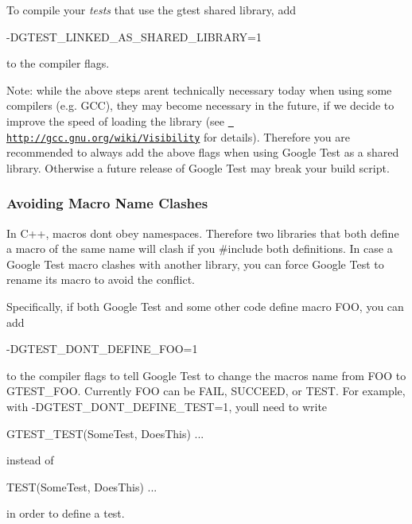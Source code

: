 To compile your {\itshape tests} that use the gtest shared library, add \begin{DoxyVerb}-DGTEST_LINKED_AS_SHARED_LIBRARY=1
\end{DoxyVerb}


to the compiler flags.

Note\+: while the above steps aren\textquotesingle{}t technically necessary today when using some compilers (e.\+g. G\+CC), they may become necessary in the future, if we decide to improve the speed of loading the library (see \href{http://gcc.gnu.org/wiki/Visibility}\texttt{ http\+://gcc.\+gnu.\+org/wiki/\+Visibility} for details). Therefore you are recommended to always add the above flags when using Google Test as a shared library. Otherwise a future release of Google Test may break your build script.

\subsubsection*{Avoiding Macro Name Clashes}

In C++, macros don\textquotesingle{}t obey namespaces. Therefore two libraries that both define a macro of the same name will clash if you {\ttfamily \#include} both definitions. In case a Google Test macro clashes with another library, you can force Google Test to rename its macro to avoid the conflict.

Specifically, if both Google Test and some other code define macro F\+OO, you can add \begin{DoxyVerb}-DGTEST_DONT_DEFINE_FOO=1
\end{DoxyVerb}


to the compiler flags to tell Google Test to change the macro\textquotesingle{}s name from {\ttfamily F\+OO} to {\ttfamily G\+T\+E\+S\+T\+\_\+\+F\+OO}. Currently {\ttfamily F\+OO} can be {\ttfamily F\+A\+IL}, {\ttfamily S\+U\+C\+C\+E\+ED}, or {\ttfamily T\+E\+ST}. For example, with {\ttfamily -\/D\+G\+T\+E\+S\+T\+\_\+\+D\+O\+N\+T\+\_\+\+D\+E\+F\+I\+N\+E\+\_\+\+T\+E\+ST=1}, you\textquotesingle{}ll need to write \begin{DoxyVerb}GTEST_TEST(SomeTest, DoesThis) { ... }
\end{DoxyVerb}


instead of \begin{DoxyVerb}TEST(SomeTest, DoesThis) { ... }
\end{DoxyVerb}


in order to define a test.


